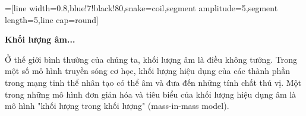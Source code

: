 \usetikzlibrary{patterns,snakes}
=[line width=0.8,blue!7!black!80,snake=coil,segment amplitude=5,segment length=5,line cap=round]

\textbf{Khối lượng âm...}

Ở thế giới bình thường của chúng ta, khối lượng âm là điều không tưởng. Trong một số mô hình truyền sóng cơ học, khối lượng hiệu dụng của các thành phần trong mạng tinh thể nhân tạo có thể âm và đưa đến những tính chất thú vị. Một trong những mô hình đơn giản hóa và tiêu biểu của khối lượng hiệu dụng âm là mô hình "khối lượng trong khối lượng" (mass-in-mass model).

